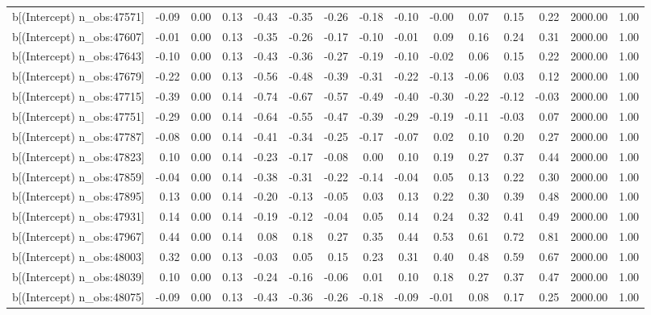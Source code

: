 \begin{table}[ht]
\begin{tabular}{rrrrrrrrrrrrrrr}
  b[(Intercept) n\_obs:47571] & -0.09 & 0.00 & 0.13 & -0.43 & -0.35 & -0.26 & -0.18 & -0.10 & -0.00 & 0.07 & 0.15 & 0.22 & 2000.00 & 1.00 \\ 
  b[(Intercept) n\_obs:47607] & -0.01 & 0.00 & 0.13 & -0.35 & -0.26 & -0.17 & -0.10 & -0.01 & 0.09 & 0.16 & 0.24 & 0.31 & 2000.00 & 1.00 \\ 
  b[(Intercept) n\_obs:47643] & -0.10 & 0.00 & 0.13 & -0.43 & -0.36 & -0.27 & -0.19 & -0.10 & -0.02 & 0.06 & 0.15 & 0.22 & 2000.00 & 1.00 \\ 
  b[(Intercept) n\_obs:47679] & -0.22 & 0.00 & 0.13 & -0.56 & -0.48 & -0.39 & -0.31 & -0.22 & -0.13 & -0.06 & 0.03 & 0.12 & 2000.00 & 1.00 \\ 
  b[(Intercept) n\_obs:47715] & -0.39 & 0.00 & 0.14 & -0.74 & -0.67 & -0.57 & -0.49 & -0.40 & -0.30 & -0.22 & -0.12 & -0.03 & 2000.00 & 1.00 \\ 
  b[(Intercept) n\_obs:47751] & -0.29 & 0.00 & 0.14 & -0.64 & -0.55 & -0.47 & -0.39 & -0.29 & -0.19 & -0.11 & -0.03 & 0.07 & 2000.00 & 1.00 \\ 
  b[(Intercept) n\_obs:47787] & -0.08 & 0.00 & 0.14 & -0.41 & -0.34 & -0.25 & -0.17 & -0.07 & 0.02 & 0.10 & 0.20 & 0.27 & 2000.00 & 1.00 \\ 
  b[(Intercept) n\_obs:47823] & 0.10 & 0.00 & 0.14 & -0.23 & -0.17 & -0.08 & 0.00 & 0.10 & 0.19 & 0.27 & 0.37 & 0.44 & 2000.00 & 1.00 \\ 
  b[(Intercept) n\_obs:47859] & -0.04 & 0.00 & 0.14 & -0.38 & -0.31 & -0.22 & -0.14 & -0.04 & 0.05 & 0.13 & 0.22 & 0.30 & 2000.00 & 1.00 \\ 
  b[(Intercept) n\_obs:47895] & 0.13 & 0.00 & 0.14 & -0.20 & -0.13 & -0.05 & 0.03 & 0.13 & 0.22 & 0.30 & 0.39 & 0.48 & 2000.00 & 1.00 \\ 
  b[(Intercept) n\_obs:47931] & 0.14 & 0.00 & 0.14 & -0.19 & -0.12 & -0.04 & 0.05 & 0.14 & 0.24 & 0.32 & 0.41 & 0.49 & 2000.00 & 1.00 \\ 
  b[(Intercept) n\_obs:47967] & 0.44 & 0.00 & 0.14 & 0.08 & 0.18 & 0.27 & 0.35 & 0.44 & 0.53 & 0.61 & 0.72 & 0.81 & 2000.00 & 1.00 \\ 
  b[(Intercept) n\_obs:48003] & 0.32 & 0.00 & 0.13 & -0.03 & 0.05 & 0.15 & 0.23 & 0.31 & 0.40 & 0.48 & 0.59 & 0.67 & 2000.00 & 1.00 \\ 
  b[(Intercept) n\_obs:48039] & 0.10 & 0.00 & 0.13 & -0.24 & -0.16 & -0.06 & 0.01 & 0.10 & 0.18 & 0.27 & 0.37 & 0.47 & 2000.00 & 1.00 \\ 
  b[(Intercept) n\_obs:48075] & -0.09 & 0.00 & 0.13 & -0.43 & -0.36 & -0.26 & -0.18 & -0.09 & -0.01 & 0.08 & 0.17 & 0.25 & 2000.00 & 1.00 \\ 

\end{tabular}
\end{table}
